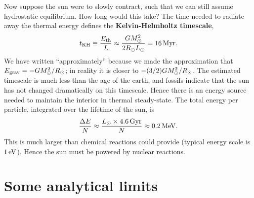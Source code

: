 Now suppose the sun were to slowly contract, such that we can still assume hydrostatic equilibrium.  How long would this take?
The time needed to radiate away the thermal energy defines the \textbf{Kelvin-Helmholtz timescale},
\begin{equation}\label{e.K-H}
t_{\mathrm{KH}} \equiv \frac{E_{\mathrm{th}}}{L} \approx \frac{GM_\odot^{2}}{2R_{\odot} L_{\odot}} = 16 \,\mathrm{M}\mathrm{yr}.
\end{equation}
We have written ``approximately'' because we made the approximation that $E_{\mathrm{grav}}  = -GM_\odot^{2}/R_{\odot}$; in reality it is closer to $-(3/2) GM_\odot^{2}/R_{\odot}$.
The estimated timescale is much less than the age of the earth, and fossils indicate that the sun has not changed dramatically on this timescale.  Hence there is an energy source needed to maintain the interior in thermal steady-state. The total energy per particle, integrated over the lifetime of the sun, is
\[ \frac{\Delta E}{N} \approx \frac{L_{\odot}\times 4.6\,\mathrm{G}\mathrm{yr}}{N} \approx 0.2\,\mathrm{M}\mathrm{eV}. \]
This is much larger than chemical reactions could provide (typical energy scale is $1\,\mathrm{eV}$). Hence the sun must be powered by nuclear reactions.

\section{Some analytical limits}

